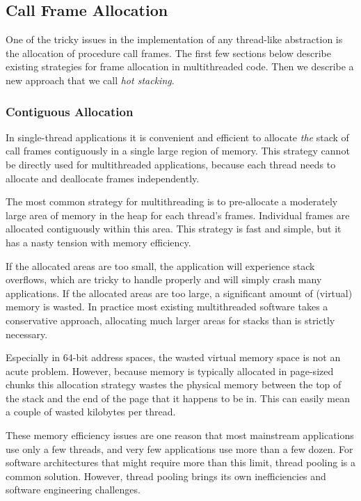 \documentclass[10pt,preprint]{sigplanconf}
\begin{document}
\subsection{Call Frame Allocation}

One of the tricky issues in the implementation of any thread-like abstraction is the allocation of procedure call frames.
The first few sections below describe existing strategies for frame allocation in multithreaded code.
Then we describe a new approach that we call \emph{hot stacking}.

\subsubsection{Contiguous Allocation}

In single-thread applications it is convenient and efficient to allocate \emph{the} stack of call frames contiguously in a single large region of memory.
This strategy cannot be directly used for multithreaded applications, because each thread needs to allocate and deallocate frames independently.

The most common strategy for multithreading is to pre-allocate a moderately large area of memory in the heap for each thread's frames.
Individual frames are allocated contiguously within this area.
This strategy is fast and simple, but it has a nasty tension with memory efficiency.

If the allocated areas are too small, the application will experience stack overflows, which are tricky to handle properly and will simply crash many applications.
If the allocated areas are too large, a significant amount of (virtual) memory is wasted.
In practice most existing multithreaded software takes a conservative approach, allocating much larger areas for stacks than is strictly necessary.

Especially in 64-bit address spaces, the wasted virtual memory space is not an acute problem.
However, because memory is typically allocated in page-sized chunks this allocation strategy wastes the physical memory between the top of the stack and the end of the page that it happens to be in.
This can easily mean a couple of wasted kilobytes per thread.

These memory efficiency issues are one reason that most mainstream applications use only a few threads, and very few applications use more than a few dozen.
For software architectures that might require more than this limit, thread pooling is a common solution.
However, thread pooling brings its own inefficiencies and software engineering challenges.
\end{document}
